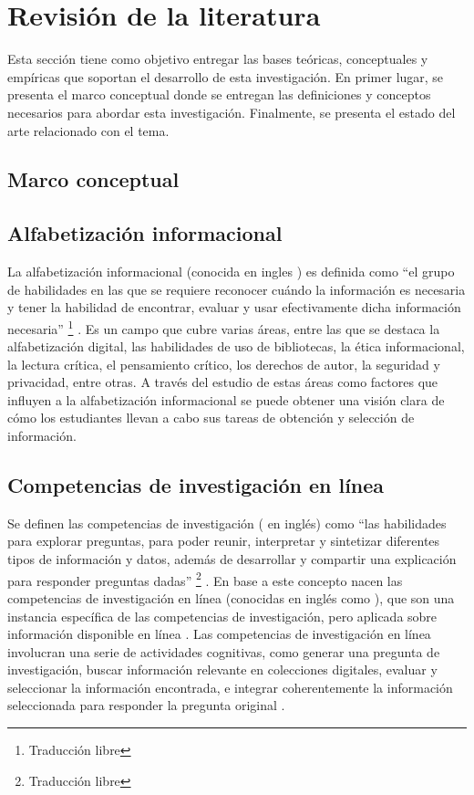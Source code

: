 \section{Revisión de la literatura}
\label{sec:revision-literatura}
Esta sección tiene como objetivo entregar las bases teóricas, conceptuales y empíricas que soportan el desarrollo de esta investigación. En primer lugar, se presenta el marco conceptual donde se entregan las definiciones y conceptos necesarios para abordar esta investigación. Finalmente, se presenta el estado del arte relacionado con el tema.

\subsection{Marco conceptual}

\subsection*{Alfabetización informacional}
La alfabetización informacional (conocida en ingles ) es definida como “el grupo de habilidades en las que se requiere reconocer cuándo la información es necesaria y tener la habilidad de encontrar, evaluar y usar efectivamente dicha información necesaria” \footnote{Traducción libre} \parencite[p.~2]{american2000information}. Es un campo que cubre varias áreas, entre las que se destaca la alfabetización digital, las habilidades de uso de bibliotecas, la ética informacional, la lectura crítica, el pensamiento crítico, los derechos de autor, la seguridad y privacidad, entre otras. A través del estudio de estas áreas como factores que influyen a la alfabetización informacional se puede obtener una visión clara de cómo los estudiantes llevan a cabo sus tareas de obtención y selección de información.

\subsection*{Competencias de investigación en línea}
Se definen las competencias de investigación ( en inglés) como “las habilidades para explorar preguntas, para poder reunir, interpretar y sintetizar diferentes tipos de información y datos, además de desarrollar y compartir una explicación para responder preguntas dadas” \footnote{Traducción libre} \parencite[p.~13]{national2000inquiry}. En base a este concepto nacen las competencias de investigación en línea (conocidas en inglés como ), que son una instancia específica de las competencias de investigación, pero aplicada sobre información disponible en línea \parencite{quintana2005framework}. Las competencias de investigación en línea involucran una serie de actividades cognitivas, como generar una pregunta de investigación, buscar información relevante en colecciones digitales, evaluar y seleccionar la información encontrada, e integrar coherentemente la información seleccionada para responder la pregunta original \parencite{eisenberg1990information}.

